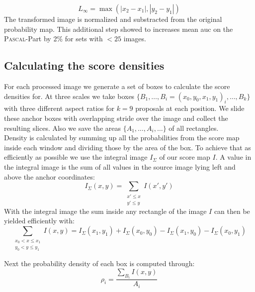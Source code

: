 \begin{equation}
    L_\infty = \max(|x_2 - x_1|, |y_2 - y_1|)
\end{equation}
The transformed image is normalized and substracted from the original probability map. This additional step showed to increases mean \gls{auc} on the \textsc{Pascal}-Part by 2\% for sets with $< 25$ images.

\subsection{Calculating the score densities}
\label{sec:pipeline:eval:density}
For each processed image we generate a set of boxes to calculate the score densities for. At three scales we take boxes $\{B_1,\dotsc, B_i = (x_0, y_0, x_1, y_1)_i,\dotsc, B_k\}$ with three different aspect ratios for $k=9$ \citep{ren_faster_2015} proposals at each position. We slide these anchor boxes  with overlapping stride over the image and collect the resulting slices. Also we save the areas $\{A_1,\dotsc, A_i,\dotsc\}$ of all rectangles.\\
Density is calculated by summing up all the probabilities from the score map inside each window and dividing those by the area of the box. To achieve that as efficiently as possible we use the integral image $I_\Sigma$ of our score map $I$. A value in the integral image is the sum of all values in the source image lying left and above the anchor coordinates:
\begin{equation}
    I_\Sigma(x, y) = \sum_{\substack{x' \le x\\ y' \le y}} I(x', y')
\end{equation}
With the integral image the sum inside any rectangle of the image $I$ can then be yielded efficiently with:
\begin{equation}
    \sum_{\substack{x_0 < x \le x_1\\ y_0 < y \le y_1}}I(x,y) = I_\Sigma(x_1, y_1) + I_\Sigma(x_0, y_0) - I_\Sigma(x_1, y_0) - I_\Sigma(x_0, y_1)
\end{equation}

Next the probability density of each box is computed through:
\begin{equation}
    \rho_i = \frac{\sum_{B_i}I(x,y)}{A_i}
\end{equation}

